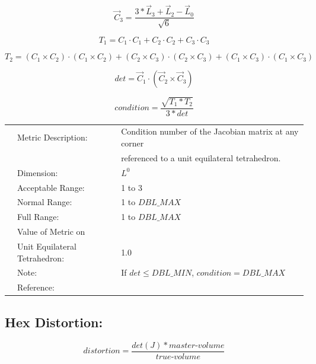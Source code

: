 \documentclass[12pt]{article}
\begin{document}
\begin{displaymath}
\vec C_3 = \frac {3 * \vec L_3 + \vec L_2 - \vec L_0 } { \sqrt{6} }
\end{displaymath}

\begin{displaymath}
T_1 = C_1 \cdot C_1 + C_2 \cdot C_2 + C_3 \cdot C_3
\end{displaymath}

\begin{displaymath}
T_2 = (C_1 \times C_2 ) \cdot (C_1 \times C_2) + 
      (C_2 \times C_3 ) \cdot (C_2 \times C_3) + 
      (C_1 \times C_3 ) \cdot (C_1 \times C_3)  
\end{displaymath}

\begin{displaymath}
det = \vec C_1 \cdot ( \vec C_2 \times \vec C_3 ) 
\end{displaymath}


\begin{displaymath}
condition = \frac{ \sqrt{ T_1 * T_2 } } { 3*det } 
\end{displaymath}


\begin{tabular}{lll}
& Metric Description:  & Condition number of the Jacobian matrix at any corner  \\
&                      & referenced to a unit equilateral tetrahedron. \\ 
& Dimension:           & $L^0$  \\
& Acceptable Range:    & 1 to 3 \\ 
& Normal Range:        & 1 to $DBL\_MAX$ \\ 
& Full Range:          & 1 to $DBL\_MAX$ \\ 
& Value of Metric on   &  \\
& Unit Equilateral Tetrahedron:    & 1.0 \\
& Note:                & If $det \leq DBL\_MIN$, $condition = DBL\_MAX$  \\
& Reference:           & \cite{two} \\
\end{tabular} 



\subsection*{Hex Distortion:} 

\begin{displaymath}
distortion = \frac{ det(J)*master\textrm{-}volume} { true\textrm{-}volume }  
\end{displaymath}
\end{document}
